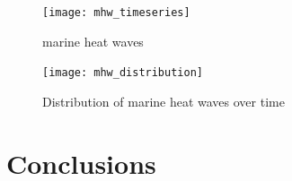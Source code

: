 \documentclass[12pt, letterpaper]{article}
\begin{document}
\begin{figure}
\texttt{[image: mhw\_timeseries]}
\caption{marine heat waves}
\label{fig:mhw_timeseries}
\end{figure}

\begin{figure}
\texttt{[image: mhw\_distribution]}
\caption{Distribution of marine heat waves over time}
\label{fig:distribution}
\end{figure}



\section{Conclusions}


\end{document}
